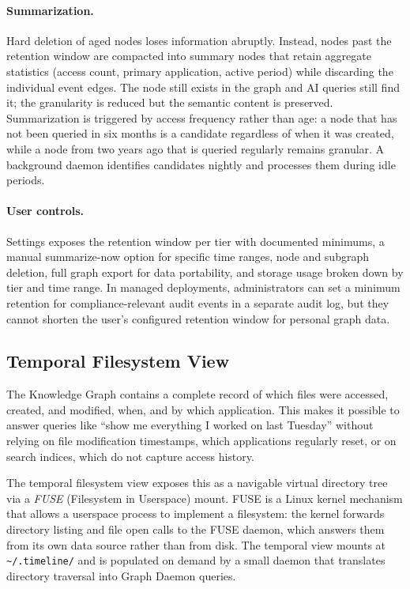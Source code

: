 \paragraph{Summarization.}
Hard deletion of aged nodes loses information abruptly. Instead, nodes past
the retention window are compacted into summary nodes that retain aggregate
statistics (access count, primary application, active period) while discarding
the individual event edges. The node still exists in the graph and AI queries
still find it; the granularity is reduced but the semantic content is
preserved. Summarization is triggered by access frequency rather than age: a
node that has not been queried in six months is a candidate regardless of when
it was created, while a node from two years ago that is queried regularly
remains granular. A background daemon identifies candidates nightly and
processes them during idle periods.

\paragraph{User controls.}
Settings exposes the retention window per tier with documented minimums, a
manual summarize-now option for specific time ranges, node and subgraph
deletion, full graph export for data portability, and storage usage broken down
by tier and time range. In managed deployments, administrators can set a
minimum retention for compliance-relevant audit events in a separate audit log,
but they cannot shorten the user's configured retention window for personal
graph data.

\subsection{Temporal Filesystem View}
\label{sec:temporal-fs}

The Knowledge Graph contains a complete record of which files were accessed,
created, and modified, when, and by which application. This makes it possible
to answer queries like ``show me everything I worked on last Tuesday'' without
relying on file modification timestamps, which applications regularly reset, or
on search indices, which do not capture access history.

The temporal filesystem view exposes this as a navigable virtual directory tree
via a \emph{FUSE} (Filesystem in Userspace) mount. FUSE is a Linux kernel
mechanism that allows a userspace process to implement a filesystem: the kernel
forwards directory listing and file open calls to the FUSE daemon, which
answers them from its own data source rather than from disk. The temporal view
mounts at \texttt{\textasciitilde/.timeline/} and is populated on demand by a
small daemon that translates directory traversal into Graph Daemon queries.

